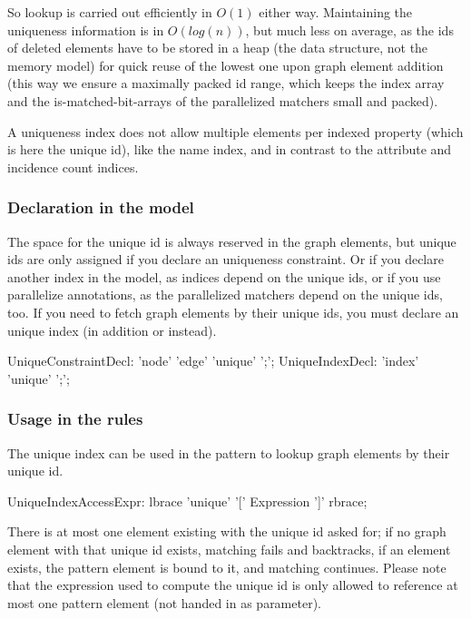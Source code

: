 So lookup is carried out efficiently in $O(1)$ either way.
Maintaining the uniqueness information is in $O(log(n))$, but much less on average, as the ids of deleted elements have to be stored in a heap (the data structure, not the memory model) for quick reuse of the lowest one upon graph element addition (this way we ensure a maximally packed id range, which keeps the index array and the is-matched-bit-arrays of the parallelized matchers small and packed).

A uniqueness index does not allow multiple elements per indexed property (which is here the unique id), like the name index, and in contrast to the attribute and incidence count indices.

\subsubsection*{Declaration in the model}
The space for the unique id is always reserved in the graph elements, but unique ids are only assigned if you declare an uniqueness constraint.
Or if you declare another index in the model, as indices depend on the unique ids, or if you use parallelize annotations, as the parallelized matchers depend on the unique ids, too.
If you need to fetch graph elements by their unique ids, you must declare an unique index (in addition or instead).

\begin{rail}
  UniqueConstraintDecl: 'node' 'edge' 'unique' ';';
  UniqueIndexDecl: 'index' 'unique' ';';
\end{rail}


\subsubsection*{Usage in the rules}
The unique index can be used in the pattern to lookup graph elements by their unique id.

\begin{rail}
  UniqueIndexAccessExpr:
    lbrace 'unique' '[' Expression ']' rbrace;
\end{rail}

There is at most one element existing with the unique id asked for; if no graph element with that unique id exists, matching fails and backtracks, if an element exists, the pattern element is bound to it, and matching continues.
Please note that the expression used to compute the unique id is only allowed to reference at most one pattern element (not handed in as parameter).

